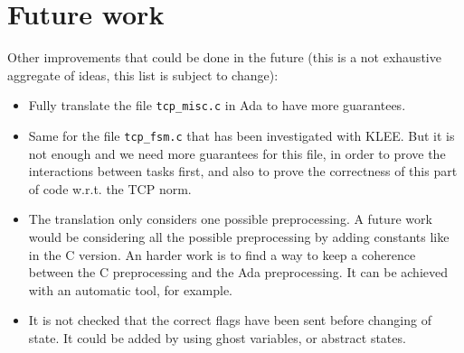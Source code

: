 \documentclass[a4paper, 10pt]{article}
\begin{document}
    


    \section{Future work}

    Other improvements that could be done in the future (this is a not exhaustive aggregate of ideas,
    this list is subject to change):
    \begin{itemize}
        \item Fully translate the file \texttt{tcp\_misc.c} in Ada to have more guarantees.
        \item Same for the file \texttt{tcp\_fsm.c} that has been investigated with KLEE. But
        it is not enough and we need more guarantees for this file, in order to prove the
        interactions between tasks first, and also to prove the correctness of this part
        of code w.r.t. the TCP norm.
        \item The translation only considers one possible preprocessing. A future work would
        be considering all the possible preprocessing by adding constants like in the C
        version. An harder work is to find a way to keep a coherence between the C preprocessing
        and the Ada preprocessing. It can be achieved with an automatic tool, for example.

        \item It is not checked that the correct flags have been sent before changing of state.
        It could be added by using ghost variables, or abstract states.
    \end{itemize}

    \printbibliography
    
\end{document}
